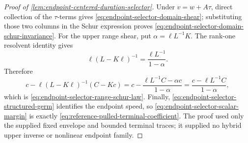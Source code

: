 \begin{proof}[Proof of
\cref{lem:endpoint-centered-duration-selector}]
Under \(v=w+A\tau\), direct collection of the \(\tau\)-terms gives
\cref{eq:endpoint-selector-domain-shear}; substituting those two columns
in the Schur expression proves
\cref{eq:endpoint-selector-domain-schur-invariance}.  For the upper range
shear, put \(\alpha=\ell L^{-1}K\).  The rank-one resolvent identity gives
\begin{equation*}
 \ell(L-K\ell)^{-1}
 =\frac{\ell L^{-1}}{1-\alpha}.
\end{equation*}
Therefore
\begin{equation*}
 c-\ell(L-K\ell)^{-1}(C-Kc)
 =c-\frac{\ell L^{-1}C-\alpha c}{1-\alpha}
 =\frac{c-\ell L^{-1}C}{1-\alpha},
\end{equation*}
which is \cref{eq:endpoint-selector-range-schur-law}.  Finally,
\cref{eq:endpoint-selector-structured-germ} identifies the endpoint speed,
so \cref{eq:endpoint-selector-scalar-margin} is exactly
\cref{eq:reference-pulled-terminal-coefficient}.  The proof used only the
supplied fixed envelope and bounded terminal traces; it supplied no hybrid
upper inverse or nonlinear endpoint family.
\end{proof}

